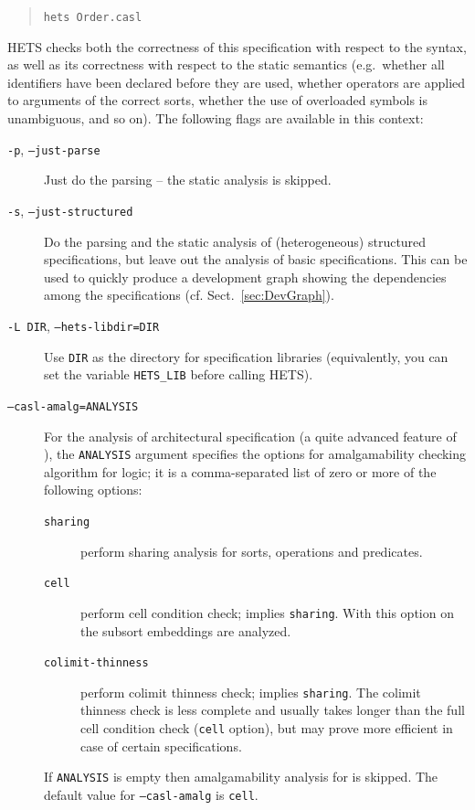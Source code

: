 \documentclass{article}
\newcommand{\normalTEXTSC}[2]{{#1\scriptsize#2}}
\newcommand     {\Hets}{\normalTEXTSC{H}{ETS}\xspace}
\begin{document}
\begin{quote}
\texttt{hets Order.casl}
\end{quote}
\Hets checks both the correctness of this specification
 with respect to the \CASL syntax, as
well as its correctness with respect to the static semantics (e.g.\
whether all identifiers have been declared before they are used,
whether operators are applied to arguments of the correct sorts,
whether the use of overloaded symbols is unambiguous, and so on).
The following flags are available in this context:
\begin{description}
\item[\texttt{-p}, \texttt{--just-parse}] Just do the parsing -- the static analysis
is skipped.
\item[\texttt{-s}, \texttt{--just-structured}]
Do the parsing and the static analysis of (heterogeneous) structured
specifications, but leave out the analysis of basic specifications.
This can be used to quickly produce a development graph
showing the dependencies among the specifications (cf. Sect.~\ref{sec:DevGraph}).
\item[\texttt{-L DIR}, \texttt{--hets-libdir=DIR}]
Use \texttt{DIR} as the directory for specification libraries
(equivalently, you can set the variable \texttt{HETS\_LIB} before
calling \Hets).
\item[\texttt{--casl-amalg=ANALYSIS}]
  For the analysis of architectural specification (a quite advanced
  feature of \CASL), the \texttt{ANALYSIS} argument specifies the options for
  amalgamability checking 
  algorithm for \CASL logic; it is a comma-separated list of zero or
  more of the following options:
  \begin{description}
  \item[\texttt{sharing}] perform sharing analysis for sorts,
    operations and predicates.
  \item[\texttt{cell}] perform cell condition check; implies
    \texttt{sharing}. With this option on the subsort embeddings are
    analyzed. 
  \item[\texttt{colimit-thinness}] perform colimit thinness check;
    implies \texttt{sharing}. The colimit thinness check is less
    complete and usually takes longer than the full cell condition
    check (\texttt{cell} option), but may prove more efficient in case
    of certain specifications. 
  \end{description}
  If \texttt{ANALYSIS} is empty then amalgamability analysis for
  \CASL is skipped. 
  The default value for \texttt{--casl-amalg} is
  \texttt{cell}. 
\end{description}
\end{document}

